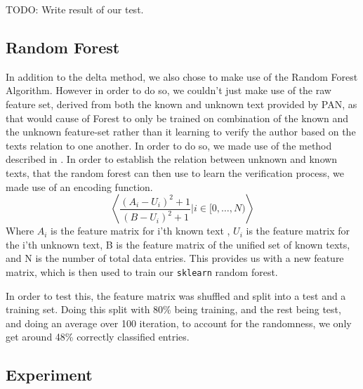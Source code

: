 TODO: Write result of our test.


\subsection{Random Forest}
In addition to the delta method, we also chose to make use of the Random Forest Algorithm. However in order to do so, we couldn't just make use of the raw feature set, derived from both the known and unknown text provided by PAN, as that would cause of Forest to only be trained on combination of the known and the unknown feature-set rather than it learning to verify the author based on the texts relation to one another. In order to do so, we made use of the method described in \cite{pacheco2015}. In order to establish the relation between unknown and known texts, that the random forest can then use to learn the verification process, we made use of an encoding function.
$$
\left\langle \dfrac{(A_i-U_i)^2+1}{(B-U_i)^2+1}|i \in [0,\dots, N)\right\rangle
$$
Where $A_i$ is the feature matrix for i'th known text , $U_i$ is the feature matrix for the i'th unknown text, B is the feature matrix of the unified set of known texts, and N is the number of total data entries.
This provides us with a new feature matrix, which is then used to train our \texttt{sklearn} random forest.

In order to test this, the feature matrix was shuffled and split into a test and a training set. Doing this split with 80\% being training, and the rest being test, and doing an average over 100 iteration, to account for the randomness, we only get around 48\% correctly classified entries. 


\subsection{Experiment}
